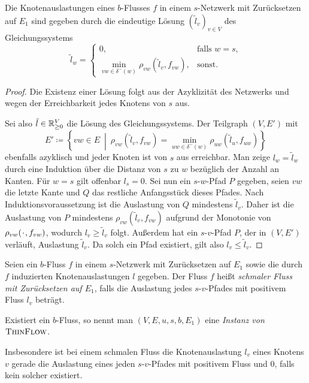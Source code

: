 \begin{proposition}\label{prop-congestion-labels-dijkstra}
	Die Knotenauslastungen eines $b$-Flusses $f$ in einem $s$-Netzwerk mit Zurücksetzen auf $E_1$ sind gegeben durch die eindeutige Lösung $(\tilde{l}_v)_{v\in V}$ des Gleichungssystems
	\[
	\tilde{l}_w = \begin{cases}
		0, & \text{falls $w=s$,}\\
		\min_{vw\in \delta^-(w)} \rho_{vw}(\tilde{l}_v, f_{vw}), & \text{sonst.}
	\end{cases}
	\]
\end{proposition}
\begin{proof}
	Die Existenz einer Lösung folgt aus der Azyklizität des Netzwerks und wegen der Erreichbarkeit jedes Knotens von $s$ aus.
	
	Sei also $\tilde{l}\in\mathbb{R}_{\geq 0}^V$ die Lösung des Gleichungssystems.
	Der Teilgraph $(V, E')$ mit \[
	E'\coloneq \left\{ vw\in E ~\middle\vert~ \rho_{vw}(\tilde{l}_v, f_{vw}) = \min_{uw\in\delta^-(w)} \rho_{uw}(\tilde{l}_u, f_{uw}) \right\}
	\]
	ebenfalls azyklisch und jeder Knoten ist von $s$ aus erreichbar.
	Man zeige $l_w = \tilde{l}_w$ durch eine Induktion über die Distanz von $s$ zu $w$ bezüglich der Anzahl an Kanten.
	Für $w=s$ gilt offenbar $l_s = 0$.
	Sei nun ein $s$-$w$-Pfad $P$ gegeben, seien $vw$ die letzte Kante und $Q$ das restliche Anfangsstück dieses Pfades.
	Nach Induktionsvoraussetzung ist die Auslastung von $Q$ mindestens $\tilde{l}_v$.
	Daher ist die Auslastung von $P$ mindestens $\rho_{vw}(\tilde{l}_v, f_{vw})$ aufgrund der Monotonie von $\rho_{vw}(\PlH, f_{vw})$, wodurch $l_v \geq \tilde{l}_v$ folgt.
	Außerdem hat ein $s$-$v$-Pfad $P$, der in $(V, E')$ verläuft, Auslastung $\tilde{l}_v$.
	Da solch ein Pfad existiert, gilt also $l_v \leq \tilde{l}_v$.
\end{proof}

\newcommand{\problemThinFlow}{\textsc{ThinFlow}}
\begin{definition}
	Seien ein $b$-Fluss $f$ in einem $s$-Netzwerk mit Zurück\-setzen auf $E_1$ sowie die durch $f$ induzierten Knotenauslastungen $l$ gegeben.
	Der Fluss $f$ heißt \emph{schmaler Fluss mit Zurücksetzen auf $E_1$}, falls die Auslastung jedes $s$-$v$-Pfades mit positivem Fluss $l_v$ beträgt.
	
	Existiert ein $b$-Fluss, so nennt man $(V, E, u, s, b, E_1)$ eine \emph{Instanz von $\problemThinFlow$}.
\end{definition}

Insbesondere ist bei einem schmalen Fluss die Knotenauslastung $l_v$ eines Knotens $v$ gerade die Auslastung eines jeden $s$-$v$-Pfades mit positivem Fluss und $0$, falls kein solcher existiert.

